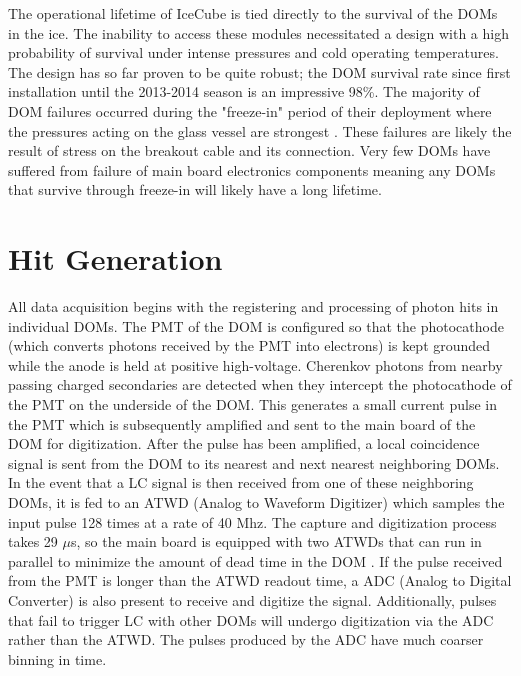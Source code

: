 \documentclass{gatech-thesis}
\begin{document}
The operational lifetime of IceCube is tied directly to the survival of the DOMs in the ice. The inability to access these modules necessitated a design with a high probability of survival under intense pressures and cold operating temperatures. The design has so far proven to be quite robust; the DOM survival rate since first installation until the 2013-2014 season is an impressive 98\%. The majority of DOM failures occurred during the "freeze-in" period of their deployment where the pressures acting on the glass vessel are strongest \cite{2009NIMPA.601..294A}. These failures are likely the result of stress on the breakout cable and its connection. Very few DOMs have suffered from failure of main board electronics components meaning any DOMs that survive through freeze-in will likely have a long lifetime.

\section{Hit Generation}

All data acquisition begins with the registering and processing of photon hits in individual DOMs. The PMT of the DOM is configured so that the photocathode (which converts photons received by the PMT into electrons) is kept grounded while the anode is held at positive high-voltage.  Cherenkov photons from nearby passing charged secondaries are detected when they intercept the photocathode of the PMT on the underside of the DOM. This generates a small current pulse in the PMT which is subsequently amplified and sent to the main board of the DOM for digitization. After the pulse has been amplified, a local coincidence signal is sent from the DOM to its nearest and next nearest neighboring DOMs. In the event that a LC signal is then received from one of these neighboring DOMs, it is fed to an ATWD (Analog to Waveform Digitizer) which samples the input pulse 128 times at a rate of 40 Mhz. The capture and digitization process takes 29 $\mu$s, so the main board is equipped with two ATWDs that can run in parallel to minimize the amount of dead time in the DOM \cite{2009NIMPA.601..294A}. If the pulse received from the PMT is longer than the ATWD readout time, a ADC (Analog to Digital Converter) is also present to receive and digitize the signal. Additionally, pulses that fail to trigger LC with other DOMs will undergo digitization via the ADC rather than the ATWD. The pulses produced by the ADC have much coarser binning in time.
\end{document}
